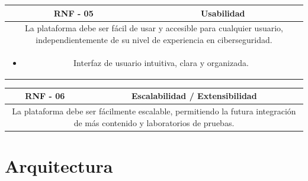             \begin{table}[!htbp]
                \centering
                \begin{tabular}{|c|c|}
                    \hline
                    \textbf{RNF - 05} & \textbf{Usabilidad} \\
                    \hline
                    \multicolumn{2}{|p{15cm}|}{
                        La plataforma debe ser fácil de usar y accesible para cualquier usuario, independientemente de su nivel de experiencia en ciberseguridad.
                    } \\
                    \hline
                    \multicolumn{2}{|p{15cm}|}{
                        \begin{itemize}
                            \item Interfaz de usuario intuitiva, clara y organizada.
                        \end{itemize}
                        } \\
                    \hline
                \end{tabular}
                \label{tab:RNF5}
            \end{table}
            
            \begin{table}[!htbp]
                \centering
                \begin{tabular}{|c|c|}
                    \hline
                    \textbf{RNF - 06} & \textbf{Escalabilidad / Extensibilidad} \\
                    \hline
                    \multicolumn{2}{|p{15cm}|}{
                        La plataforma debe ser fácilmente escalable, permitiendo la futura integración de más contenido y laboratorios de pruebas.
                    } \\
                    \hline
                \end{tabular}
                \label{tab:RNF6}
            \end{table}
            
            \cleardoublepage
    
    
    \section{Arquitectura}
        \label{sec:arquitectura}
        
